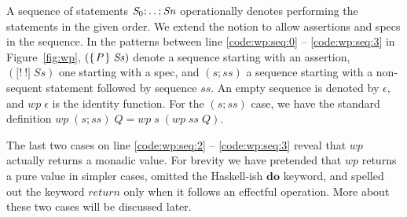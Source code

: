 \documentclass[runningheads]{llncs}
\newcommand{\Conid}[1]{\mathit{#1}}
\newcommand{\Varid}[1]{\mathit{#1}}
\let\Varid\mathit
\let\Conid\mathit
\begin{document}
A sequence of statements \ensuremath{\Conid{S}_{0};\mathinner{\ldotp\ldotp};\Conid{Sn}} operationally denotes performing the statements in the given order.
We extend the notion to allow assertions and specs in the sequence.
In the patterns between line \ref{code:wp:seq:0} -- \ref{code:wp:seq:3} in Figure~\ref{fig:wp},
\ensuremath{(\{\mskip1.5mu \Conid{P}\mskip1.5mu\}\;\Conid{Ss})} denote a sequence starting with an assertion,
\ensuremath{(\lbrack!~!\rbrack\;\Conid{Ss})} one starting with a spec,
and \ensuremath{(\Varid{s};\Varid{ss})} a sequence starting with a non-sequent statement followed by sequence \ensuremath{\Varid{ss}}.
An empty sequence is denoted by \ensuremath{\epsilon}, and \ensuremath{\Varid{wp}\;\epsilon} is the identity function.
For the \ensuremath{(\Varid{s};\Varid{ss})} case, we have the standard definition \ensuremath{\Varid{wp}\;(\Varid{s};\Varid{ss})\;\Conid{Q}\mathrel{=}\Varid{wp}\;\Varid{s}\;(\Varid{wp}\;\Varid{ss}\;\Conid{Q})}.

The last two cases on line \ref{code:wp:seq:2} -- \ref{code:wp:seq:3} reveal that \ensuremath{\Varid{wp}} actually returns a monadic value.
For brevity we have pretended that \ensuremath{\Varid{wp}} returns a pure value in simpler cases,
omitted the Haskell-ish \ensuremath{\mathbf{do}} keyword,
and spelled out the keyword \ensuremath{\Varid{return}} only when it follows an effectful operation.
More about these two cases will be discussed later.
\end{document}
